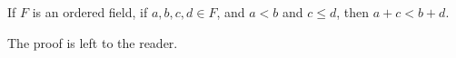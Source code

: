 If $F$ is an ordered field, if $a, b, c, d \in F$, and $a < b$ and $c \leq d$, then $a + c < b + d$.

The proof is left to the reader.